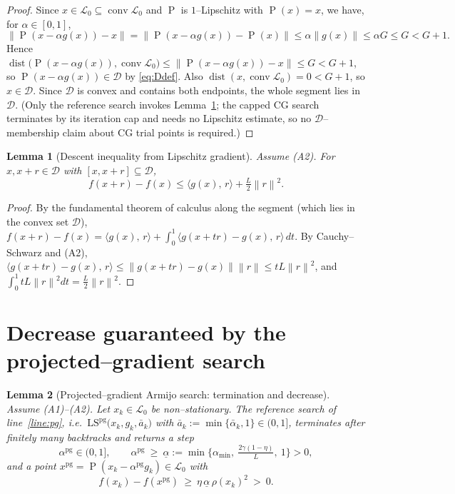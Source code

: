 \documentclass[12pt]{article}
\newtheorem{lemma}{Lemma}
\DeclareMathOperator{\proj}{P}
\newcommand{\norm}[1]{\left\lVert #1 \right\rVert}
\newcommand{\inner}[2]{\langle #1,\, #2\rangle}
\begin{document}
\begin{proof}
Since $x\in\mathcal L_0\subseteq\operatorname{conv}\mathcal L_0$ and $\proj$ is
$1$--Lipschitz with $\proj(x)=x$, we have, for $\alpha\in[0,1]$,
\[
\norm{\proj(x-\alpha g(x))-x}=\norm{\proj(x-\alpha g(x))-\proj(x)}
\le\alpha\norm{g(x)}\le\alpha G\le G<G+1 .
\]
Hence $\operatorname{dist}\!\big(\proj(x-\alpha g(x)),
\operatorname{conv}\mathcal L_0\big)\le\norm{\proj(x-\alpha g(x))-x}\le G<G+1$,
so $\proj(x-\alpha g(x))\in\mathcal D$ by \eqref{eq:Ddef}. Also
$\operatorname{dist}(x,\operatorname{conv}\mathcal L_0)=0<G+1$, so
$x\in\mathcal D$. Since $\mathcal D$ is convex and contains both endpoints, the
whole segment lies in $\mathcal D$. (Only the reference search invokes
Lemma~\ref{lem:taylor}; the capped CG search terminates by its iteration cap and
needs no Lipschitz estimate, so no $\mathcal D$--membership claim about CG trial
points is required.)
\end{proof}

\begin{lemma}[Descent inequality from Lipschitz gradient]\label{lem:taylor}
Assume (A2). For $x,x+r\in\mathcal D$ with $[x,x+r]\subseteq\mathcal D$,
\begin{equation}\label{eq:desclemma}
f(x+r)-f(x)\le\inner{g(x)}{r}+\tfrac{L}{2}\norm{r}^2 .
\end{equation}
\end{lemma}

\begin{proof}
By the fundamental theorem of calculus along the segment (which lies in the
convex set $\mathcal D$),
$f(x+r)-f(x)=\inner{g(x)}{r}+\int_0^1\inner{g(x+tr)-g(x)}{r}\,dt$. By
Cauchy--Schwarz and (A2),
$\inner{g(x+tr)-g(x)}{r}\le\norm{g(x+tr)-g(x)}\norm{r}\le tL\norm{r}^2$, and
$\int_0^1 tL\norm{r}^2dt=\tfrac{L}{2}\norm{r}^2$.
\end{proof}

\section{Decrease guaranteed by the projected--gradient search}

\begin{lemma}[Projected--gradient Armijo search: termination and decrease]
\label{lem:pg}
Assume (A1)--(A2). Let $x_k\in\mathcal L_0$ be non--stationary. The reference
search of line~\ref{line:pg}, i.e.\
$\mathrm{LS}^{\mathrm{pg}}\big(x_k,g_k,\bar a_k\big)$ with
$\bar a_k:=\min\{\bar\alpha_k,1\}\in(0,1]$, terminates after finitely many
backtracks and returns a step
\begin{equation}\label{eq:steplb}
\alpha^{\mathrm{pg}}\in(0,1],\qquad
\alpha^{\mathrm{pg}}\ \ge\ \underline\alpha:=
\min\Big\{\alpha_{\min},\ \tfrac{2\gamma(1-\eta)}{L},\ 1\Big\}>0,
\end{equation}
and a point $x^{\mathrm{pg}}=\proj(x_k-\alpha^{\mathrm{pg}}g_k)\in\mathcal L_0$
with
\begin{equation}\label{eq:pg-dec}
f(x_k)-f(x^{\mathrm{pg}})\ \ge\ \eta\,\underline\alpha\,\rho(x_k)^2\ >\ 0 .
\end{equation}
\end{lemma}
\end{document}

